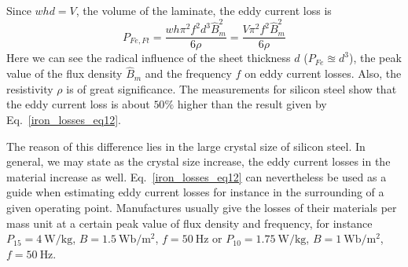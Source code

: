 \documentclass[11pt,a4paper,oneside]{book}
\begin{document}
\begin{onehalfspace}
\begin{equation}
\end{equation}
Since $whd=V$, the volume of the laminate, the eddy current loss is 
\begin{equation}\label{iron_losses_eq12}
	P_{Fe,Ft}=\frac{wh\pi^2f^2d^3\hat{B}_m^2}{6\rho}=\frac{V\pi^2f^2\hat{B}_m^2}{6\rho}
\end{equation}
Here we can see the radical influence of the sheet thickness $d$ ($P_{Fe}\approxeq d^3$), the peak value of the flux density $\hat{B}_m$ and the frequency $f$ on eddy current losses. Also, the resistivity $\rho$ is of great significance. The measurements for silicon steel show that the eddy current loss is about $50\%$ higher than the result given by Eq.~\eqref{iron_losses_eq12}.

The reason of this difference lies in the large crystal size of silicon steel. In general, we may state as the crystal size increase, the eddy current losses in the material increase as well. Eq.~\eqref{iron_losses_eq12} can nevertheless be used as a guide when estimating eddy current losses for instance in the surrounding of a given operating point. Manufactures usually give the losses of their materials per mass unit at a certain peak value of flux density and frequency, for instance $P_{15} = \SI{4}{\watt\per\kilo\gram}$, $B=\SI{1.5}{\weber\per\square\meter}$, $f=\SI{50}{\hertz}$ or $P_{10} = \SI{1.75}{\watt\per\kilo\gram}$, $B=\SI{1}{\weber\per\square\meter}$, $f=\SI{50}{\hertz}$.


\end{onehalfspace}
\end{document}
